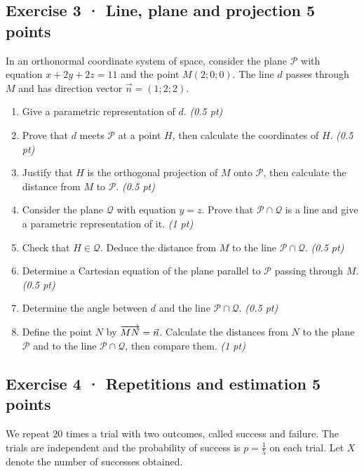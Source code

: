 \subsection*{Exercise 3 · Line, plane and projection \hfill 5 points}In an orthonormal coordinate system of space, consider the plane $\mathcal P$ with equation $x+2y+2z=11$ and the point $M(2;0;0)$. The line $d$ passes through $M$ and has direction vector $\vec n=(1;2;2)$.

\begin{enumerate}

\item Give a parametric representation of $d$. \hfill\textit{(0.5 pt)}

\item Prove that $d$ meets $\mathcal P$ at a point $H$, then calculate the coordinates of $H$. \hfill\textit{(0.5 pt)}

\item Justify that $H$ is the orthogonal projection of $M$ onto $\mathcal P$, then calculate the distance from $M$ to $\mathcal P$. \hfill\textit{(0.5 pt)}

\item Consider the plane $\mathcal Q$ with equation $y=z$. Prove that $\mathcal P\cap\mathcal Q$ is a line and give a parametric representation of it. \hfill\textit{(1 pt)}

\item Check that $H\in\mathcal Q$. Deduce the distance from $M$ to the line $\mathcal P\cap\mathcal Q$. \hfill\textit{(0.5 pt)}

\item Determine a Cartesian equation of the plane parallel to $\mathcal P$ passing through $M$. \hfill\textit{(0.5 pt)}

\item Determine the angle between $d$ and the line $\mathcal P\cap\mathcal Q$. \hfill\textit{(0.5 pt)}

\item Define the point $N$ by $\overrightarrow{MN}=\vec n$. Calculate the distances from $N$ to the plane $\mathcal P$ and to the line $\mathcal P\cap\mathcal Q$, then compare them. \hfill\textit{(1 pt)}

\end{enumerate}

\subsection*{Exercise 4 · Repetitions and estimation \hfill 5 points}We repeat $20$ times a trial with two outcomes, called success and failure. The trials are independent and the probability of success is $p=\frac{1}{5}$ on each trial. Let $X$ denote the number of successes obtained.

